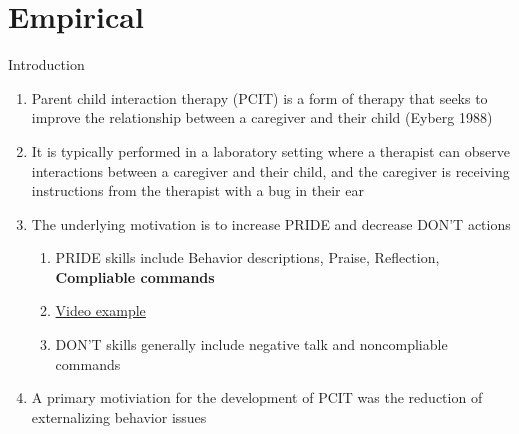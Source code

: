 \documentclass[
  ignorenonframetext,
]{beamer}
\providecommand{\tightlist}{%
  \setlength{\itemsep}{0pt}\setlength{\parskip}{0pt}}
\begin{document}
\section{Empirical}\label{empirical}

\begin{frame}{Introduction}
\label{introduction}
\begin{enumerate}
\tightlist
\item
  Parent child interaction therapy (PCIT) is a form of therapy that
  seeks to improve the relationship between a caregiver and their child
  (Eyberg 1988)
\item
  It is typically performed in a laboratory setting where a therapist
  can observe interactions between a caregiver and their child, and the
  caregiver is receiving instructions from the therapist with a bug in
  their ear
\item
  The underlying motivation is to increase PRIDE and decrease DON'T
  actions

  \begin{enumerate}
  \tightlist
  \item
    PRIDE skills include Behavior descriptions, Praise, Reflection,
    \textbf{Compliable commands}
  \item
    \href{https://www.youtube.com/watch?v=bldyeAk2InM}{Video example}
  \item
    DON'T skills generally include negative talk and noncompliable
    commands
  \end{enumerate}
\item
  A primary motiviation for the development of PCIT was the reduction of
  externalizing behavior issues
\end{enumerate}
\end{frame}
\end{document}
